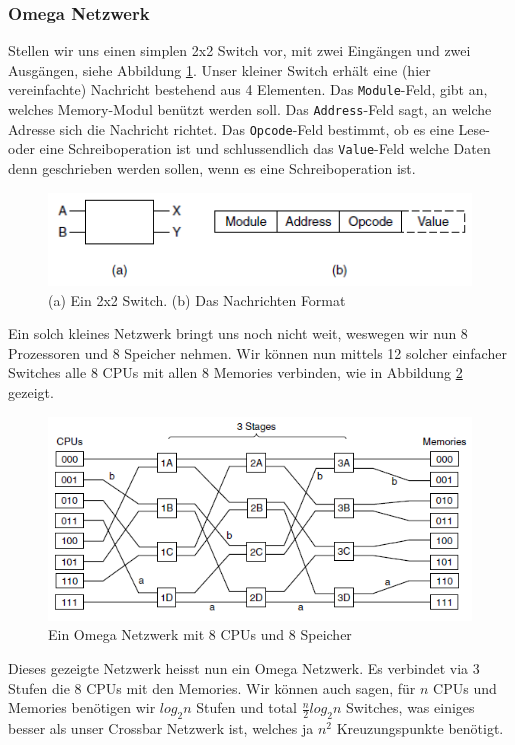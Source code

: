 \subsubsection{Omega Netzwerk}
Stellen wir uns einen simplen 2x2 Switch vor, mit zwei Eingängen und zwei Ausgängen, siehe Abbildung \ref{fig:omegaswitch}. Unser kleiner Switch erhält eine (hier vereinfachte) Nachricht bestehend aus 4 Elementen. Das \texttt{Module}-Feld, gibt an, welches Memory-Modul benützt werden soll. Das \texttt{Address}-Feld sagt, an welche Adresse sich die Nachricht richtet. Das \texttt{Opcode}-Feld bestimmt, ob es eine Lese- oder eine Schreiboperation ist und schlussendlich das \texttt{Value}-Feld welche Daten denn geschrieben werden sollen, wenn es eine Schreiboperation ist.
\begin{figure}
\centering
\includegraphics[width=0.7\linewidth]{fig/omega_switch}
\caption{(a) Ein 2x2 Switch. (b) Das Nachrichten Format}
\label{fig:omegaswitch}
\end{figure}

Ein solch kleines Netzwerk bringt uns noch nicht weit, weswegen wir nun 8 Prozessoren und 8 Speicher nehmen. Wir können nun mittels 12 solcher einfacher Switches alle 8 CPUs mit allen 8 Memories verbinden, wie in Abbildung \ref{fig:omega_gross} gezeigt.
\begin{figure}
\centering
\includegraphics[width=0.7\linewidth]{fig/omega_gross}
\caption{Ein Omega Netzwerk mit 8 CPUs und 8 Speicher}
\label{fig:omega_gross}
\end{figure}
Dieses gezeigte Netzwerk heisst nun ein Omega Netzwerk. Es verbindet via 3 Stufen die 8 CPUs mit den Memories. Wir können auch sagen, für $ n $ CPUs und Memories benötigen wir $ log_{2} n $ Stufen und total $ \frac{n}{2} log_{2}n $ Switches, was einiges besser als unser Crossbar Netzwerk ist, welches ja $ n^{2} $ Kreuzungspunkte benötigt.

